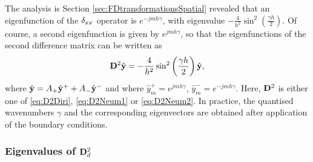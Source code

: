 The analysis is Section  \ref{sec:FDtransformationsSpatial} revealed that an eigenfunction of the $\delta_{xx}$ operator is $e^{-jm h \gamma}$, with eigenvalue $-\frac{4}{h^2}\sin^2\left( \frac{\gamma h}{2}\right)$. Of course, a second eigenfunction is given by $e^{jm h \gamma}$, so that the eigenfunctions of the second difference matrix can  be written as
\begin{equation}
{\bf D}^2 \hat {\bf y} = -\frac{4}{h^2}\sin^2\left( \frac{\gamma h}{2}\right)\hat {\bf y},
\end{equation}
where $\hat {\bf y} = A_+ \hat {\bf y}^+ + A_- \hat {\bf y}^- $ and where $\hat { y}^+_m = e^{jmh\gamma}$, $\hat { y}^-_m = e^{-jmh\gamma}$. Here, ${\bf D}^2$ is either one of \eqref{eq:D2Diri}, \eqref{eq:D2Neum1} or \eqref{eq:D2Neum2}. In practice, the quantised wavenumbers $\gamma$ and the corresponding eigenvectors are obtained after application of the boundary conditions. 


\subsubsection{Eigenvalues of ${\bf D}^2_d$}

